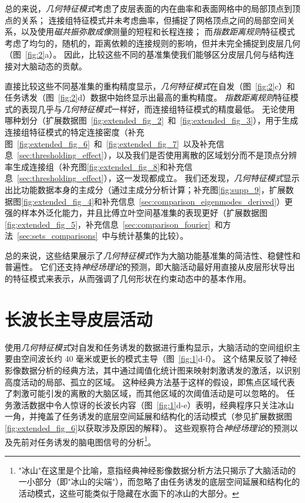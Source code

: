 \documentclass[lang=cn,a4paper,newtx]{elegantpaper}
\begin{document}
总的来说，\textit{几何特征模式}考虑了皮层表面的内在曲率和表面网格中的局部顶点到顶点的关系；
连接组特征模式并未考虑曲率，但捕捉了网格顶点之间的局部空间关系，以及使用\textit{磁共振弥散成像}测量的短程和长程连接；
而\textit{指数距离规则}特征模式考虑了均匀的，随机的，距离依赖的连接规则的影响，但并未完全捕捉到皮层几何（图~\ref{fig:2}a）。
因此，比较这些不同的基准集使我们能够区分皮层几何与结构连接对大脑动态的贡献。


直接比较这些不同基准集的重构精度显示，\textit{几何特征模式}在自发（图~\ref{fig:2}c）和任务诱发（图~\ref{fig:2}d）数据中始终显示出最高的重构精度。
\textit{指数距离规则}特征模式的表现几乎与\textit{几何特征模式}一样好，而连接组特征模式的精度最低。
无论使用哪种划分（扩展数据图~\ref{fig:extended_fig_2}~和~\ref{fig:extended_fig_3}），用于生成连接组特征模式的特定连接密度（补充图~\ref{fig:extended_fig_6}~和~\ref{fig:extended_fig_7}~以及补充信息~\ref{sec:thresholding_effect}），以及我们是否使用离散的区域划分而不是顶点分辨率生成连接组（补充图\ref{fig:extended_fig_8}和补充信息~\ref{sec:thresholding_effect}），这一发现都成立。
我们还发现，\textit{几何特征模式}显示出比功能数据本身的主成分（通过主成分分析计算；补充图\ref{fig:supp_9}，扩展数据图\ref{fig:extended_fig_4}和补充信息~\ref{sec:comparison_eigenmodes_derived}）更强的样本外泛化能力，并且比傅立叶空间基准集的表现更好（扩展数据图\ref{fig:extended_fig_5}，补充信息~\ref{sec:comparison_fourier}~和方法~\ref{sec:sets_comparisons}~中与统计基集的比较）。


总的来说，这些结果展示了\textit{几何特征模式}作为大脑功能基准集的简洁性、稳健性和普遍性。
它们还支持\textit{神经场理论}的预测，即大脑活动最好用直接从皮层形状导出的特征模式来表示，从而强调了几何形状在约束动态中的基本作用。




\section{长波长主导皮层活动}

使用\textit{几何特征模式}对自发和任务诱发的数据进行重构显示，大脑活动的空间组织主要由空间波长约 40 毫米或更长的模式主导（图~\ref{fig:1}d-f）。
这个结果反驳了神经影像数据分析的经典方法，其中通过阈值化统计图来映射刺激诱发的激活，以识别高度活动的局部、孤立的区域。
这种经典方法基于这样的假设，即焦点区域代表了刺激可能引发的离散的大脑区域，而其他区域的次阈值活动是可以忽略的。
任务激活数据中令人惊讶的长波长内容（图~\ref{fig:1}d-e）表明，经典程序只关注冰山一角，并掩盖了任务诱发的底层空间延展和结构化的活动模式（参见扩展数据图\ref{fig:extended_fig_6}以获取涉及原因的解释）。
这些观察符合\textit{神经场理论}的预测以及先前对任务诱发的脑电图信号的分析\footnote{"冰山"在这里是个比喻，意指经典神经影像数据分析方法只揭示了大脑活动的一小部分（即"冰山的尖端"），而忽略了由任务诱发的底层空间延展和结构化的活动模式，这些可能类似于隐藏在水面下的冰山的大部分。}。
\end{document}
